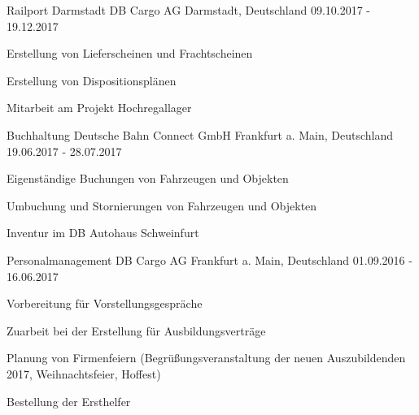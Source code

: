 \begin{cventries}
  \cventry
    {Railport Darmstadt} %
    {DB Cargo AG} %
    {Darmstadt, Deutschland} %
    {09.10.2017 - 19.12.2017} %
    {
      \begin{cvitems} %
        \item {Erstellung von Lieferscheinen und Frachtscheinen}
        \item {Erstellung von Dispositionsplänen}
        \item {Mitarbeit am Projekt {\glqq}Hochregallager{\grqq}}
      \end{cvitems}
    }
    
  \cventry
    {Buchhaltung} %
    {Deutsche Bahn Connect GmbH} %
    {Frankfurt a. Main, Deutschland} %
    {19.06.2017 - 28.07.2017} %
    {
      \begin{cvitems} %
        \item {Eigenständige Buchungen von Fahrzeugen und Objekten}
        \item {Umbuchung und Stornierungen von Fahrzeugen und Objekten}
        \item {Inventur im DB Autohaus Schweinfurt}
      \end{cvitems}
    }

  \cventry
    {Personalmanagement} %
    {DB Cargo AG} %
    {Frankfurt a. Main, Deutschland} %
    {01.09.2016 - 16.06.2017} %
    {
      \begin{cvitems} %
        \item {Vorbereitung für Vorstellungsgespräche}
        \item {Zuarbeit bei der Erstellung für Ausbildungsverträge}
        \item {Planung von Firmenfeiern (Begrüßungsveranstaltung der neuen Auszubildenden 2017, Weihnachtsfeier, Hoffest)}
        \item{Bestellung der Ersthelfer}
      \end{cvitems}
    }

\end{cventries}
